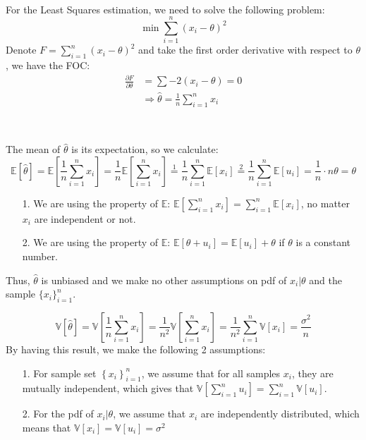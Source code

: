 \begin{solution}
    \

    For the Least Squares estimation, we need to solve the following problem:
    \[
    \min \sum_{i=1}^{n}(x_i - \theta)^2
    \]
    Denote $F = \sum\limits_{i=1}^{n}(x_i - \theta)^2$ and take the first order derivative with respect to $\theta$, we have the FOC: 
    \begin{align*}
        \frac{\partial F}{\partial \theta} & = \sum -2(x_i - \theta) = 0 \\
        & \Rightarrow \hat{\theta} = \frac{1}{n} \sum_{i=1}^{n}x_i
    \end{align*}
    
\end{solution}

\begin{solution}
    \ 
    
    The mean of $\hat{\theta}$ is its expectation, so we calculate:
    \[
    \mathbb{E}[\hat{\theta}] = \mathbb{E}\left[\frac{1}{n} \sum_{i=1}^{n}x_i\right] = \frac{1}{n} \mathbb{E}\left[\sum_{i=1}^{n}x_i\right] \overset{1}{=} \frac{1}{n} \sum_{i=1}^{n}\mathbb{E}[x_i] \overset{2}{=} \frac{1}{n} \sum_{i=1}^{n}\mathbb{E}[u_i] = \frac{1}{n} \cdot n\theta = \theta
    \]
    \begin{itemize}
        \item[1.] We are using the property of $\mathbb{E}$: $\mathbb{E}\left[\sum\limits_{i=1}^{n}x_i\right] = \sum\limits_{i=1}^{n}\mathbb{E}[x_i]$, no matter $x_i$ are independent or not.
        \item[2.] We are using the property of $\mathbb{E}$: $\mathbb{E}[\theta + u_i] = \mathbb{E}[u_i] + \theta$ if $\theta$ is a constant number.
    \end{itemize}
    Thus, $\hat{\theta}$ is unbiased and we make no other assumptions on pdf of $x_i | \theta$ and the sample $\{x_i\}_{i=1}^{n}$.
\end{solution}

\begin{solution}
    \[
    \mathbb{V}[\hat{\theta}] = \mathbb{V}\left[\frac{1}{n} \sum_{i=1}^{n}x_i\right] = \frac{1}{n^2} \mathbb{V}\left[\sum_{i=1}^{n}x_i\right] = \frac{1}{n^2} \sum\limits_{i=1}^{n}\mathbb{V}[x_i] = \frac{\sigma^2}{n}
    \]
    By having this result, we make the following 2 assumptions:
    \begin{itemize}
        \item[1.] For sample set $\left\{x_i\right\}_{i=1}^{n}$, we assume that for all samples $x_i$, they are mutually independent, which gives that $\mathbb{V}\left[\sum\limits_{i=1}^{n}u_i\right] =  \sum\limits_{i=1}^{n}\mathbb{V}[u_i]$.
        \item[2.] For the pdf of $x_i|\theta$, we assume that $x_i$ are independently distributed, which means that $\mathbb{V}[x_i] = \mathbb{V}[u_i] = \sigma^2$
    \end{itemize}
\end{solution}
